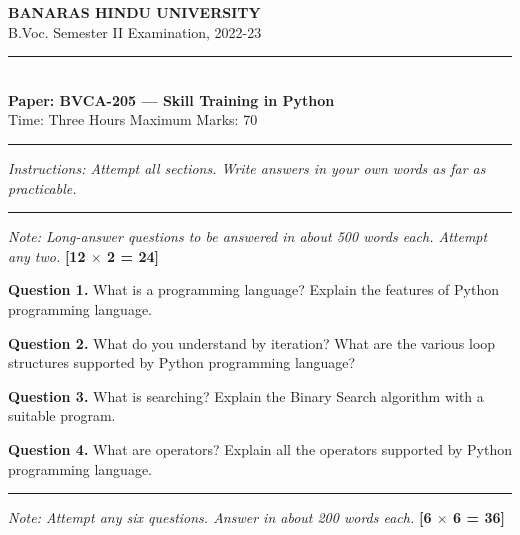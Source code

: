 \documentclass[11pt,a4paper]{article}
\begin{document}
\begin{center}
  {\large\bfseries BANARAS HINDU UNIVERSITY}\\[2pt]
  {
\normalsize B.Voc. Semester II Examination, 2022-23}\\[6pt]
  \rule{0.8\linewidth}{0.5pt}\\[6pt]
  {\large\bfseries Paper: BVCA-205 --- Skill Training in Python}\\[4pt]
  {
\normalsize Time: Three Hours \hfill Maximum Marks: 70}
\end{center}

\rule{\linewidth}{0.4pt}

\smallskip



\noindent   \textit{Instructions: Attempt all sections. Write answers in your own words as far as practicable.}

\bigskip

\bigskip


\rule{\linewidth}{0.4pt}\smallskip




\noindent   \textit{Note: Long-answer questions to be answered in about 500 words each. Attempt any two.} \hfill   \textbf{[12 $ \times$ 2 = 24]}

\medskip


\noindent   \textbf{Question 1.} What is a programming language? Explain the features of Python programming language.

\medskip


\noindent   \textbf{Question 2.} What do you understand by iteration? What are the various loop structures supported by Python programming language?

\medskip


\noindent   \textbf{Question 3.} What is searching? Explain the Binary Search algorithm with a suitable program.

\medskip


\noindent   \textbf{Question 4.} What are operators? Explain all the operators supported by Python programming language.

\bigskip


\rule{\linewidth}{0.4pt}\smallskip




\noindent   \textit{Note: Attempt any six questions. Answer in about 200 words each.} \hfill   \textbf{[6 $ \times$ 6 = 36]}
\end{document}
